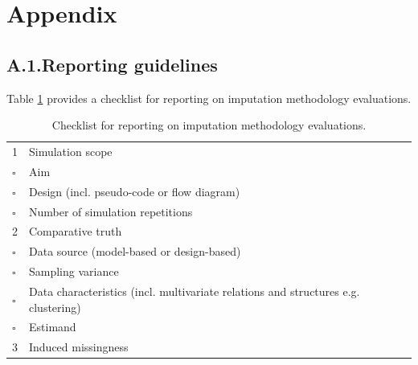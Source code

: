 \documentclass[bimj,fleqn]{w-art}
\begin{document}
\newpage

\section*{Appendix}

\subsection*{A.1.\enspace Reporting guidelines}

Table \ref{table:check} provides a checklist for reporting on imputation methodology evaluations. 

\begin{table}[ht!]
\caption{Checklist for reporting on imputation methodology evaluations.}
\label{table:check}
\begin{tabular}{ll}
\hline
1 & Simulation scope                                                                   \\ \cline{2-2}
$\square$  & Aim                                                                                \\
$\square$  & Design (incl. pseudo-code or flow diagram)                                         \\
$\square$  & Number of simulation repetitions                                                   \\ \hline
2 & Comparative truth                                                                  \\ \cline{2-2}
$\square$  & Data source (model-based or design-based)                                           \\
$\square$  & Sampling variance                                                                  \\
$\square$  & Data characteristics (incl. multivariate relations and structures e.g. clustering) \\
$\square$  & Estimand                                                                           \\ \hline 
3 & Induced missingness                                                                \\ \cline{2-2}

\end{tabular}
\end{table}
\end{document}

